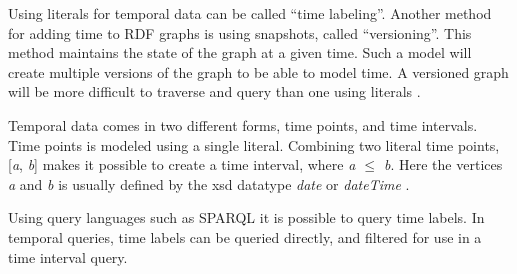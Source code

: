 Using literals for temporal data can be called ``time labeling''. Another method for adding time to RDF graphs is using snapshots, called ``versioning''. This method maintains the state of the graph at a given time. Such a model will create multiple versions of the graph to be able to model time. A versioned graph will be more difficult to traverse and query than one using literals \cite{gutierrez2006introducing}. 

Temporal data comes in two different forms, time points, and time intervals. Time points is modeled using a single literal. Combining two literal time points, [\emph{a}, \emph{b}] makes it possible to create a time interval, where \emph{a $\leq$ b}. Here the vertices \emph{a} and \emph{b} is usually defined by the xsd datatype \emph{date} or \emph{dateTime} \cite{tappolet2009applied}.

Using query languages such as SPARQL it is possible to query time labels. In temporal queries, time labels can be queried directly, and filtered for use in a time interval query. 

\glsresetall